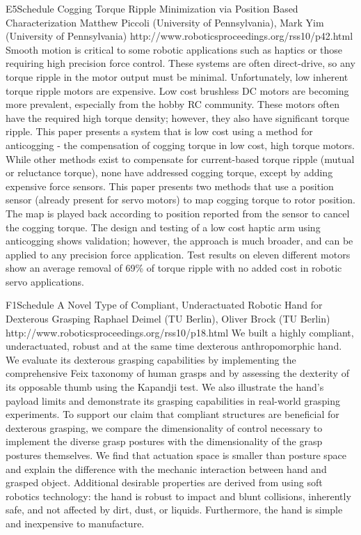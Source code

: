 \begin{spacing}{1.0}
\descriptionPaper
{E5}{Schedule}
{	
Cogging Torque Ripple Minimization via Position Based Characterization
}
{
Matthew Piccoli (University of Pennsylvania), Mark Yim (University of Pennsylvania)
}
{
http://www.roboticsproceedings.org/rss10/p42.html
}
{
Smooth motion is critical to some robotic applications such as haptics or those requiring high precision force control. These systems are often direct-drive, so any torque ripple in the motor output must be minimal. Unfortunately, low inherent torque ripple motors are expensive. Low cost brushless DC motors are becoming more prevalent, especially from the hobby RC community. These motors often have the required high torque density; however, they also have significant torque ripple. This paper presents a system that is low cost using a method for anticogging - the compensation of cogging torque in low cost, high torque motors. While other methods exist to compensate for current-based torque ripple (mutual or reluctance torque), none have addressed cogging torque, except by adding expensive force sensors. This paper presents two methods that use a position sensor (already present for servo motors) to map cogging torque to rotor position. The map is played back according to position reported from the sensor to cancel the cogging torque. The design and testing of a low cost haptic arm using anticogging shows validation; however, the approach is much broader, and can be applied to any precision force application. Test results on eleven different motors show an average removal of 69\% of torque ripple with no added cost in robotic servo applications.
}





\descriptionPaper
{F1}{Schedule}
{	
A Novel Type of Compliant, Underactuated Robotic Hand for Dexterous Grasping 
}
{
Raphael Deimel (TU Berlin), Oliver Brock (TU Berlin)
}
{
http://www.roboticsproceedings.org/rss10/p18.html
}
{
We built a highly compliant, underactuated, robust and at the same time dexterous anthropomorphic hand. We evaluate its dexterous grasping capabilities by implementing the comprehensive Feix taxonomy of human grasps and by assessing the dexterity of its opposable thumb using the Kapandji test. We also illustrate the hand's payload limits and demonstrate its grasping capabilities in real-world grasping experiments. To support our claim that compliant structures are beneficial for dexterous grasping, we compare the dimensionality of control necessary to implement the diverse grasp postures with the dimensionality of the grasp postures themselves. We find that actuation space is smaller than posture space and explain the difference with the mechanic interaction between hand and grasped object. Additional desirable properties are derived from using soft robotics technology: the hand is robust to impact and blunt collisions, inherently safe, and not affected by dirt, dust, or liquids. Furthermore, the hand is simple and inexpensive to manufacture.
}





\end{spacing}
